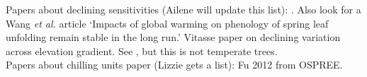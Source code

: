 \documentclass[11pt,letter]{article}
\begin{document}
Papers about declining sensitivities (Ailene will update this list): \cite{Rutishauser:2008,fu2015}. Also look for a Wang \emph{et al.} article `Impacts of global warming on phenology of spring leaf unfolding remain stable in the long run.' Vitasse paper on declining variation across elevation gradient. See \cite{yu2010}, but this is not temperate trees. \\

Papers about chilling units paper (Lizzie gets a list): Fu 2012 from OSPREE. \cite{harrington2015}\cite{lued2011,Luedeling:2011qe,Luedeling2013AgFM}\\


\end{document}
